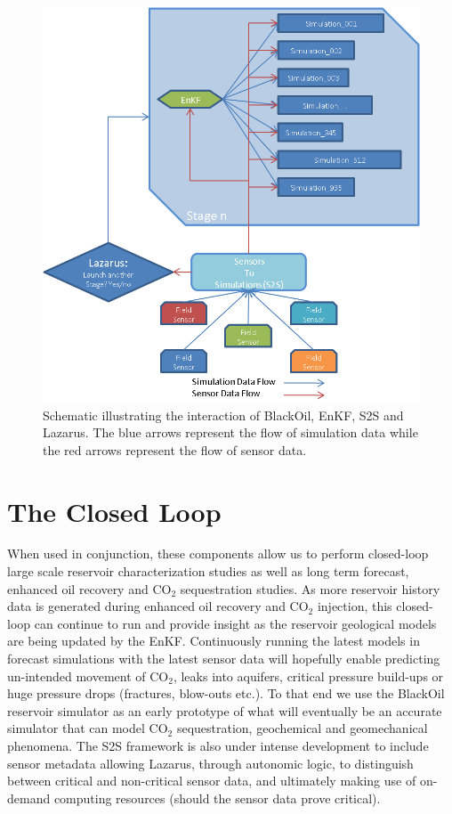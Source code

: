 \documentclass[10pt,conference,final]{IEEEtran}
\begin{document}
\begin{figure}
\begin{center}
\includegraphics*[scale=0.65,angle=0]{figures/Picture2.png}
\end{center}
\caption{Schematic illustrating the interaction of BlackOil, EnKF, S2S and Lazarus. The 
blue arrows represent the flow of 
simulation data while the red arrows represent the flow of sensor data.}
\label{fig:Data Flow}
\end{figure}

\section*{The Closed Loop}

When used in conjunction, these components allow us to perform closed-loop large scale reservoir characterization studies as well as long term forecast, enhanced oil recovery and CO$_2$ sequestration studies. As more reservoir history data is generated during enhanced oil recovery and CO$_2$ injection, this closed-loop can continue to run and provide insight as the reservoir geological models are being updated by the EnKF.  Continuously running the latest models in forecast simulations with the latest sensor data will hopefully enable predicting un-intended movement of CO$_2$, leaks into aquifers, critical pressure build-ups or huge pressure drops (fractures, blow-outs etc.). To that end we use the BlackOil reservoir simulator as an early prototype of what will eventually be an accurate simulator that can model CO$_2$ sequestration, geochemical and geomechanical phenomena. The S2S framework is also under intense development to include sensor metadata allowing Lazarus, through autonomic logic, to distinguish between critical and non-critical sensor data, and ultimately making use of on-demand computing resources (should the sensor data prove critical).
\end{document}
